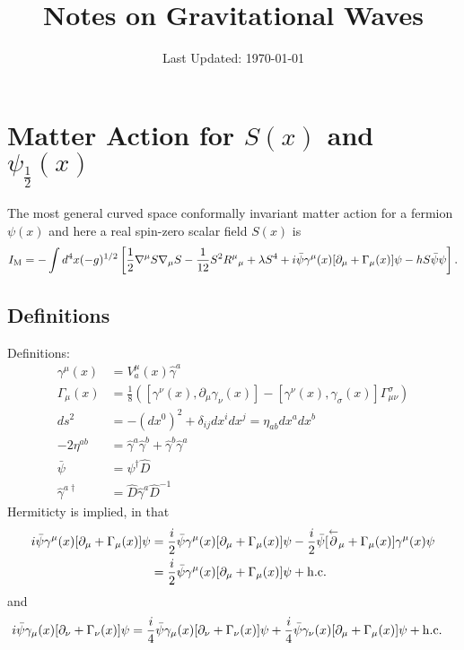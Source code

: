 \documentclass[10pt,letterpaper]{article}
\title{Notes on Gravitational Waves}
\author{}
\date{Last Updated: \today}
\numberwithin{equation}{subsection}
\begin{document}
\maketitle
\tableofcontents
\newpage
\section{Matter Action for $S(x)$ and $\psi_{\frac12}(x)$}
The most general curved space conformally invariant matter action for a fermion $\psi(x)$ and here a real spin-zero scalar field $S(x)$ is
\begin{equation}
	I_{\rm M} = -\int d^4x(-g)^{1/2} \left[ \frac12 \nabla^\mu S \nabla_\mu S - \frac{1}{12} S^2 R^{\mu}{}_{\mu} + \lambda S^4 
+ i\bar\psi\gamma^\mu(x)[\partial_\mu + \Gamma_\mu(x)]\psi -hS\bar\psi\psi\right]\label{GRW1}.
\end{equation}
\subsection{Definitions}
Definitions:
\begin{align}
\gamma^\mu(x) &= V^\mu_a(x)\hat \gamma ^a
\nonumber\\
\Gamma_\mu(x) &= \frac{1}{8}\left( [\gamma^\nu(x),\partial_\mu\gamma_\nu(x)] -[\gamma^\nu(x),\gamma_\sigma(x)]\Gamma^\sigma_{\mu\nu} \right)
\nonumber\\
ds^2 &= -(dx^0)^2 + \delta_{ij}dx^idx^j = \eta_{ab}dx^a dx^b
\nonumber\\
-2\eta^{ab} &= \hat \gamma^a \hat \gamma^b + \hat \gamma^b \hat\gamma^a 
\nonumber\\
\bar\psi &= \psi^\dagger \hat D
\nonumber\\
\hat \gamma^{a\dagger} &= \hat D \hat\gamma^a \hat D^{-1}
\end{align}
Hermiticty is implied, in that
\begin{align}
i\bar\psi \gamma^\mu(x)[\partial_\mu+ \Gamma_\mu(x)]\psi &= \frac{i}{2} \bar \psi\gamma^\mu(x)[\partial_\mu + \Gamma_{\mu}(x)]\psi - \frac{i}{2}
\bar\psi[\overset{\leftarrow}\partial_\mu +\Gamma_\mu(x)]\gamma^\mu(x)\psi
\nonumber\\
&= \frac{i}{2}\bar\psi\gamma^\mu(x)[\partial_\mu+\Gamma_\mu(x)]\psi + \rm{h.c.} 
\end{align}
and
\begin{align}
i\bar\psi\gamma_\mu(x)[\partial_\nu+\Gamma_\nu(x)]\psi &= \frac{i}{4}\bar\psi \gamma_\mu(x)[\partial_\nu + \Gamma_\nu(x)]\psi +
\frac{i}{4} \bar\psi \gamma_\nu(x)[\partial_\mu + \Gamma_\mu(x)]\psi + \rm{h.c.}
\end{align}
\end{document}
